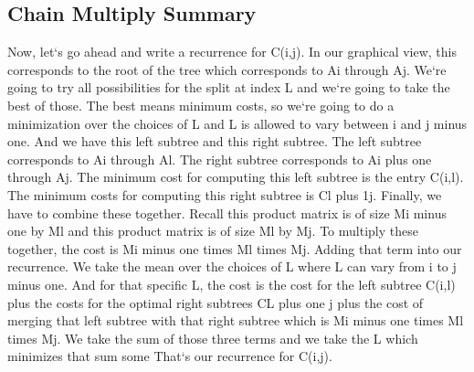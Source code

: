 \subsection{Chain Multiply  Summary}
Now, let`s go ahead and write a recurrence for C(i,j).
In our graphical view, this corresponds to the root of the tree which corresponds to Ai through Aj.
We`re going to try all possibilities for the split at index L and we`re going to take the best of those.
The best means minimum costs, so we`re going to do a minimization over the choices of L and L is allowed to vary between i and j minus one.
And we have this left subtree and this right subtree.
The left subtree corresponds to Ai through Al.
The right subtree corresponds to Ai plus one through Aj.
The minimum cost for computing this left subtree is the entry C(i,l).
The minimum costs for computing this right subtree is Cl plus 1j.
Finally, we have to combine these together.
Recall this product matrix is of size Mi minus one by Ml and this product matrix is of size Ml by Mj.
To multiply these together, the cost is Mi minus one times Ml times Mj.
Adding that term into our recurrence.
We take the mean over the choices of L where L can vary from i to j minus one.
And for that specific L, the cost is the cost for the left subtree C(i,l) plus the costs for the optimal right subtrees CL plus one j plus the cost of merging that left subtree with that right subtree which is Mi minus one times Ml times Mj.
We take the sum of those three terms and we take the L which minimizes that sum some That`s our recurrence for C(i,j).

